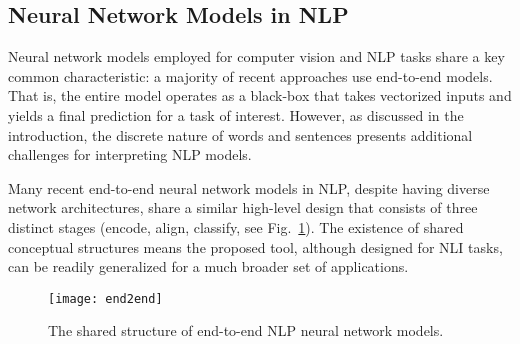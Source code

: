 

\subsection{Neural Network Models in NLP}
Neural network models employed for computer vision and NLP tasks share a key common characteristic: a majority of recent approaches use end-to-end models. That is, the entire model operates as a black-box that takes vectorized inputs and yields a final prediction for a task of interest.
However, as discussed in the introduction, the discrete nature of words and sentences presents additional challenges for
interpreting NLP models.
%

Many recent end-to-end neural network models in NLP, despite having  diverse network architectures, share a similar high-level design that consists of three distinct stages (encode, align, classify, see Fig.~\ref{fig:end2end}).
%
The existence of shared conceptual structures means the proposed tool, although designed for NLI tasks, can be readily generalized for a much broader set of applications.

\begin{figure}[htbp]
\centering
\vspace{-3mm}
 \texttt{[image: end2end]}
 \vspace{-6mm}
 \caption{The shared structure of end-to-end NLP neural network models.}
  \vspace{-3mm}
\label{fig:end2end}
\end{figure}

